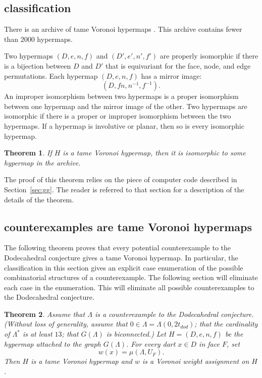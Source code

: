 \documentclass{article} %
\newtheorem{theorem}{Theorem}[section]
\begin{document}
\subsection{classification}\label{sec:class}

There is an archive of tame Voronoi hypermaps \cite{code}.  This
archive contains fewer than $2000$ hypermaps.  

Two hypermaps $(D,e,n,f)$ and $(D',e',n',f')$ are properly isomorphic if there
is a bijection between $D$ and $D'$ that is equivariant for the face, node, and
edge permutations.  Each hypermap $(D,e,n,f)$ has a mirror image:
  $$
  (D,f n, n^{-1},f^{-1}).
  $$
  An improper
isomorphism between two hypermaps is a proper isomorphism between one hypermap and the
mirror image of the other.
Two hypermaps are isomorphic if there is a proper or improper isomorphism between
the two hypermaps. If a hypermap is involutive or planar, then so is every isomorphic
hypermap.

\begin{theorem}  If $H$ is a tame Voronoi hypermap, then it is isomorphic to
some hypermap in the archive.
\end{theorem}

The proof of this theorem relies on the piece of 
computer code described in Section~\ref{sec:gg}.  The reader is referred to that section
for a description of the details of the theorem.

\subsection{counterexamples are tame Voronoi hypermaps}

The following theorem proves that every potential counterexample to the Dodecahedral
conjecture gives a tame Voronoi hypermap.  In particular, the classification
in this section gives an explicit case enumeration of the possible combinatorial structures
of a counterexample.  The following section will eliminate each case in the enumeration.
This will eliminate all possible counterexamples to the Dodecahedral conjecture.

\begin{theorem}  Assume that $\Lambda$ is a counterexample to the Dodecahedral
conjecture.  (Without loss of generality,  assume that $0\in\Lambda=\Lambda(0,2t_{dod})$;
that the cardinality of $\Lambda^*$ is at least $13$; that $G(\Lambda)$ is biconnected.)  Let $H=(D,e,n,f)$ be the hypermap attached to the graph $G(\Lambda)$.
 For every dart $x\in D$ in face $F$, set
$$w(x) = \mu(\Lambda,U_F).$$
Then $H$ is a tame Voronoi hypermap and $w$ is a Voronoi weight assignment on $H$.
\end{theorem}
\end{document}
